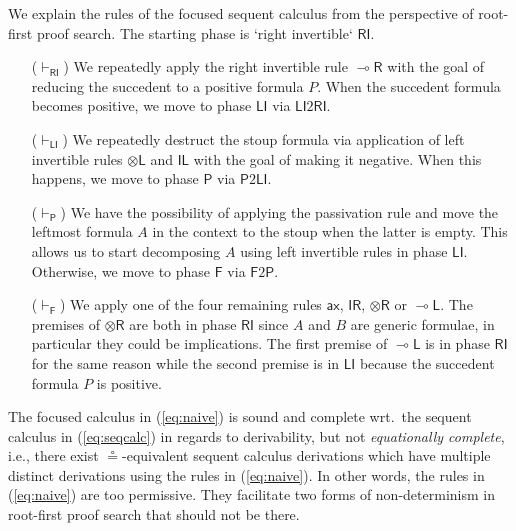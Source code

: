 \documentclass[copyright,creativecommons]{eptcs}
\theoremstyle{definition}
\newcommand{\tl}{\otimes \mathsf{L}}
\newcommand{\tr}{\otimes \mathsf{R}}
\newcommand{\lright}{{\multimap}\mathsf{R}}
\newcommand{\lleft}{{\multimap}\mathsf{L}}
\newcommand{\unitl}{\mathsf{IL}}
\newcommand{\unitr}{\mathsf{IR}}
\newcommand{\ax}{\mathsf{ax}}
\newcommand{\RI}{\mathsf{RI}}
\newcommand{\LI}{\mathsf{LI}}
\newcommand{\Pass}{\mathsf{P}}
\newcommand{\F}{\mathsf{F}}
\begin{document}
We explain the rules of the focused sequent calculus from the perspective of root-first proof search. The starting phase is `right invertible` $\RI$.
\begin{itemize}
\item[($\vdash_\RI$)] We repeatedly apply the right invertible rule $\lright$ with the goal of reducing the succedent to a positive formula $P$.
  When the succedent formula becomes positive, we move to phase $\LI$ via $\LI2\RI$.
\item[($\vdash_\LI$)] We repeatedly destruct the stoup formula via application of left invertible rules $\tl$ and $\unitl$ with the goal of making it negative. When this happens, we move to phase $\Pass$ via $\Pass2\LI$.
\item[($\vdash_\Pass$)] We have the possibility of applying the passivation rule and move the leftmost formula $A$ in the context to the stoup when the latter is empty. This allows us to start decomposing $A$ using left invertible rules in phase $\LI$. Otherwise, we move to phase $\F$ via $\F2\Pass$.
\item[($\vdash_\F$)] We apply one of the four remaining rules $\ax$, $\unitr$, $\tr$ or $\lleft$. The premises of $\tr$ are both in phase $\RI$ since $A$ and $B$ are generic formulae, in particular they could be implications. The first premise of $\lleft$ is in phase $\RI$ for the same reason while the second premise is in $\LI$ because the succedent formula $P$ is positive.
\end{itemize}

The focused calculus in (\ref{eq:naive}) is sound and complete wrt.\ the sequent calculus in (\ref{eq:seqcalc}) in regards to derivability, but not \emph{equationally complete}, i.e., there exist $\circeq$-equivalent sequent calculus derivations which have multiple distinct derivations using the rules in (\ref{eq:naive}). In other words, the rules in (\ref{eq:naive}) are too permissive. They facilitate two forms of non-determinism in root-first proof search that should not be there.
\end{document}
